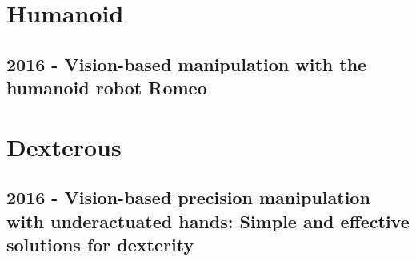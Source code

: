 \section{Humanoid}
\subsection{2016 - Vision-based manipulation with the humanoid robot Romeo}

\section{Dexterous}
\subsection{2016 - Vision-based precision manipulation with underactuated hands: Simple and effective solutions for dexterity}